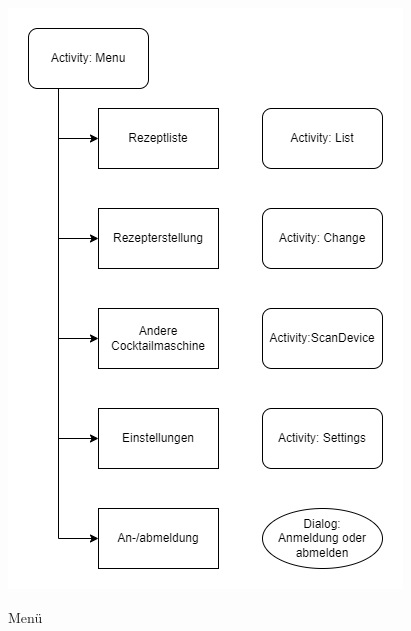{\includegraphics[scale=0.65]{Menu.png}


\begin{table}
	\centering
	\caption{Menü}
	\label{table:menu}
	

\end{table}}

